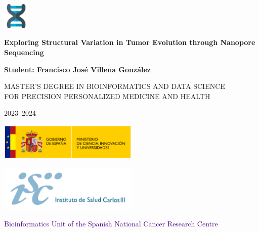 \begin{titlepage}

    \begin{flushright}
        \includegraphics[width=0.095\textwidth]{img/dna.jpg}
    \end{flushright}

    \centering
    \vspace{0.8cm}

    \Huge
    \textbf{Exploring Structural Variation in Tumor Evolution
    through Nanopore Sequencing}

    \vspace{0.8cm}

    \large
    \textbf{Student: Francisco José Villena González}

    \vspace{0.8cm}

    \large
    MASTER'S DEGREE IN BIOINFORMATICS AND DATA SCIENCE \\
    FOR PRECISION PERSONALIZED MEDICINE AND HEALTH

    \vspace{0.25cm}
    \large
    2023--2024

    \vspace{0.9cm}

    \includegraphics[width=0.5\textwidth]{img/logo-ministerio.png}
    
    \vspace{0cm}
    
    \includegraphics[width=0.5\textwidth]{img/logo_ISCIII.jpg}

    \vspace{0.8cm}

    \begin{flushleft}
        \large
        \textcolor{indigo}{Bioinformatics Unit of the Spanish National 
        Cancer Research Centre}
        

\end{flushleft}
\end{titlepage}
